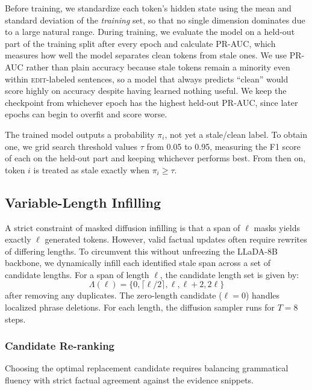 \documentclass[11pt]{article}
\newcommand{\edit}{\textsc{edit}}
\begin{document}
    Before training, we standardize each token's hidden state using the mean
    and standard deviation of the \emph{training} set, so that no single
    dimension dominates due to a large natural range. During training, we
    evaluate the model on a held-out part of the training split after every epoch and calculate
    PR-AUC, which measures how well the model separates clean tokens from
    stale ones. We use PR-AUC rather than plain accuracy because stale tokens
    remain a minority even within \edit{}-labeled sentences, so a model that
    always predicts ``clean'' would score highly on accuracy despite having
    learned nothing useful. We keep the checkpoint from whichever epoch
    has the highest held-out PR-AUC, since later epochs can begin to
    overfit and score worse.
    
    The trained model outputs a probability $\pi_i$, not yet a stale/clean
    label. To obtain one, we grid search threshold values $\tau$ from 0.05 to
    0.95, measuring the F1 score of each on the held-out part and
    keeping whichever performs best. From then on, token $i$ is treated as
    stale exactly when $\pi_i \geq \tau$.
    
    \subsection{Variable-Length Infilling}
    \label{subsec:infilling}
        A strict constraint of masked diffusion infilling is that a span of $\ell$ masks yields exactly $\ell$ generated tokens. However, valid factual updates often require rewrites of differing lengths. To circumvent this without unfreezing the LLaDA-8B backbone, we dynamically infill each identified stale span across a set of candidate lengths. For a span of length $\ell$, the candidate length set is given by:
        \begin{equation}
            \Lambda(\ell) = \{ 0, \lceil \ell/2 \rceil, \ell, \ell + 2, 2\ell \}
        \end{equation}
        after removing any duplicates. The zero-length candidate ($\ell=0$) handles localized phrase deletions. For each length, the diffusion sampler runs for $T=8$ steps.

        \subsubsection{Candidate Re-ranking}
        Choosing the optimal replacement candidate requires balancing grammatical fluency with strict factual agreement against the evidence snippets.
        
\end{document}
